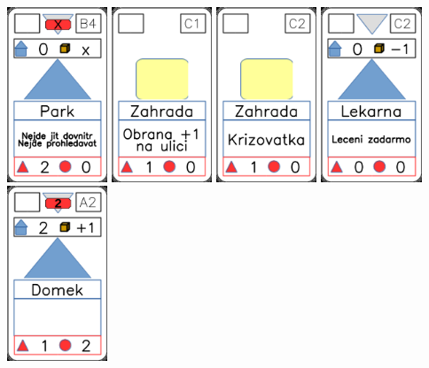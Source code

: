 \documentclass[a4paper]{article}
\begin{document}
	\includegraphics[width=3.0cm]{img-3_23}
	\includegraphics[width=3.0cm]{img-2_25}
	\includegraphics[width=3.0cm]{img-2_26}
	\includegraphics[width=3.0cm]{img-3_11}
	\includegraphics[width=3.0cm]{img-3_1}
\end{document}
